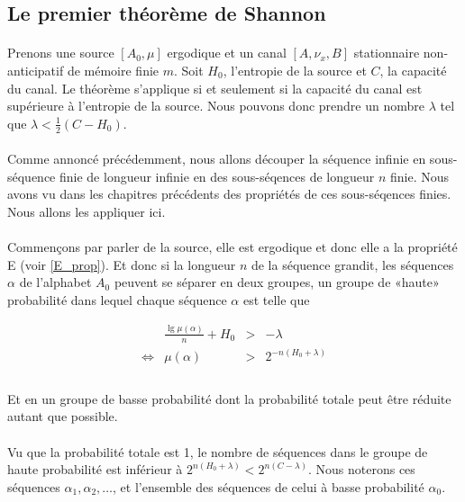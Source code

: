 \subsection{Le premier théorème de Shannon}

	\paragraph{}
	Prenons une source $[A_0,\mu]$ ergodique et un canal $[A,\nu_x,B]$ stationnaire non-anticipatif de mémoire finie $m$. 
	Soit $H_0$, l'entropie de la source et $C$, la capacité du canal. Le théorème s'applique si et seulement si la capacité 
	du canal est supérieure à l'entropie de la source. Nous pouvons donc prendre un nombre $\lambda$ tel que $\lambda<\frac{1}{2}(C-H_0)$. 
	
	\paragraph{}
	Comme annoncé précédemment, nous allons découper la séquence infinie en sous-séquence finie de longueur infinie en des sous-séqences 
	de longueur $n$ finie. Nous avons vu dans les chapitres précédents des propriétés de ces sous-séqences finies. Nous allons les appliquer ici.

	\paragraph{}
	Commençons par parler de la source, elle est ergodique et donc elle a la propriété E (voir \ref{E_prop}). 
	Et donc si la longueur $n$ de la séquence grandit, les séquences $\alpha$ de l'alphabet	$A_0$ peuvent se 
	séparer en deux groupes, un groupe de «haute» probabilité dans lequel chaque séquence $\alpha$ est telle que
	
	\[
		\begin{array}{crcl}
			&\frac{\lg \mu\left(\alpha\right)}{n}+H_0 &>& -\lambda\\
			\Leftrightarrow & \mu(\alpha) & > &2^{-n\left(H_0+\lambda\right)}\\
		\end{array}
	\]
	
	\paragraph{}
	Et en un groupe de basse probabilité dont la probabilité totale peut être réduite autant que possible.

	\paragraph{}
	Vu que la probabilité totale est 1, le nombre de séquences dans le groupe de haute probabilité est inférieur à $2^{n(H_0+\lambda)}<2^{n(C-\lambda)}$.
	Nous noterons ces séquences $\alpha_1,\alpha_2,\dots$, et l'ensemble des séquences de celui à basse probabilité $\alpha_0$.
	
